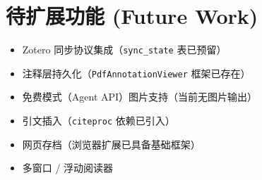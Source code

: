 \documentclass[12pt, a4paper]{article}
\begin{document}
\section{待扩展功能 (Future Work)}

\begin{itemize}[leftmargin=2em, itemsep=2pt]
  \item Zotero 同步协议集成（\texttt{sync\_state} 表已预留）
  \item 注释层持久化（\texttt{PdfAnnotationViewer} 框架已存在）
  \item 免费模式（Agent API）图片支持（当前无图片输出）
  \item 引文插入（\texttt{citeproc} 依赖已引入）
  \item 网页存档（浏览器扩展已具备基础框架）
  \item 多窗口 / 浮动阅读器
\end{itemize}

\end{document}

